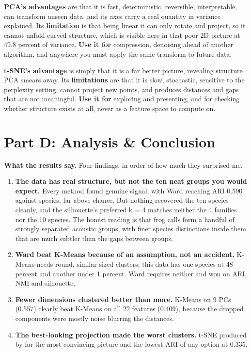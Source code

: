 \documentclass[11pt,a4paper]{article}
\begin{document}
\textbf{PCA's advantages} are that it is fast, deterministic, reversible, interpretable,
can transform unseen data, and its axes carry a real quantity in variance explained. Its
\textbf{limitation} is that being linear it can only rotate and project, so it cannot
unfold curved structure, which is visible here in that poor 2D picture at 49.8 percent of
variance. \textbf{Use it for} compression, denoising ahead of another algorithm, and
anywhere you must apply the same transform to future data.

\textbf{t-SNE's advantage} is simply that it is a far better picture, revealing structure
PCA smears away. Its \textbf{limitations} are that it is slow, stochastic, sensitive to
the perplexity setting, cannot project new points, and produces distances and gaps that
are not meaningful. \textbf{Use it for} exploring and presenting, and for checking
whether structure exists at all, never as a feature space to compute on.

\section*{Part D: Analysis \& Conclusion}

\textbf{What the results say.} Four findings, in order of how much they surprised me.

\begin{enumerate}
    \item \textbf{The data has real structure, but not the ten neat groups you would
    expect.} Every method found genuine signal, with Ward reaching ARI 0.590 against
    species, far above chance. But nothing recovered the ten species cleanly, and the
    silhouette's preferred k = 4 matches neither the 4 families nor the 10 species. The
    honest reading is that frog calls form a handful of strongly separated acoustic
    groups, with finer species distinctions inside them that are much subtler than the
    gaps between groups.
    \item \textbf{Ward beat K-Means because of an assumption, not an accident.} K-Means
    needs round, similar-sized clusters; this data has one species at 48 percent and
    another under 1 percent. Ward requires neither and won on ARI, NMI and silhouette.
    \item \textbf{Fewer dimensions clustered better than more.} K-Means on 9 PCs (0.557)
    clearly beat K-Means on all 22 features (0.409), because the dropped components were
    mostly noise blurring the distances.
    \item \textbf{The best-looking projection made the worst clusters.} t-SNE produced by
    far the most convincing picture and the lowest ARI of any option at 0.335.
\end{enumerate}
\end{document}
